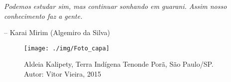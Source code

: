 
\vspace*{\fill}

\epigraph{\emph{Podemos estudar sim, mas continuar sonhando em guarani. Assim nosso conhecimento faz a gente.}}{-- Karai Mirim (Algemiro da Silva)}

\thispagestyle{empty}

\pagebreak

\vspace*{\fill}

\begin{figure}[H]
\begin{adjustwidth}{-2.7cm}{}
  \texttt{[image: ./img/Foto\_capa]}
\end{adjustwidth}
\caption{Aldeia Kalipety, Terra Indígena Tenonde Porã, São Paulo/SP. Autor: Vitor Vieira, 2015}
\end{figure}

\vspace*{\fill}

\thispagestyle{empty}